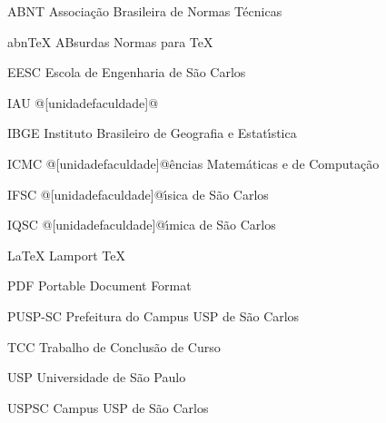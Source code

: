 \begin{siglas}
    \item[ABNT] Associa\c{c}\~ao Brasileira de Normas T\'ecnicas
    \item[abnTeX] ABsurdas Normas para TeX
	\item[EESC] Escola de Engenharia de S\~ao Carlos
	\item[IAU] @[unidadefaculdade]@
	\item[IBGE] Instituto Brasileiro de Geografia e Estat\'{\i}stica
	\item[ICMC] @[unidadefaculdade]@\^encias Matem\'aticas e de Computa\c{c}\~ao
	\item[IFSC] @[unidadefaculdade]@\'{\i}sica de S\~ao Carlos
	\item[IQSC] @[unidadefaculdade]@\'{\i}mica de S\~ao Carlos
	\item[LaTeX] Lamport TeX
	\item[PDF] Portable Document Format
	\item[PUSP-SC] Prefeitura do Campus USP de S\~ao Carlos
	\item[TCC] Trabalho de Conclus\~ao de Curso
	\item[USP] Universidade de S\~ao Paulo
	\item[USPSC] Campus USP de S\~ao Carlos
\end{siglas}

